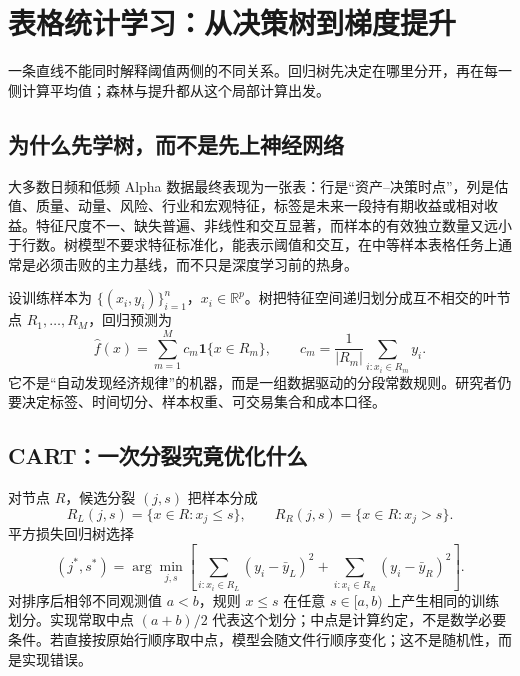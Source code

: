 \chapter{表格统计学习：从决策树到梯度提升}
\label{ch:lower-ml-model}

\begin{itemize}
  
\end{itemize}

一条直线不能同时解释阈值两侧的不同关系。回归树先决定在哪里分开，再在每一侧计算平均值；森林与提升都从这个局部计算出发。


\section{为什么先学树，而不是先上神经网络}

大多数日频和低频 Alpha 数据最终表现为一张表：行是“资产--决策时点”，列是估值、质量、动量、风险、行业和宏观特征，标签是未来一段持有期收益或相对收益。特征尺度不一、缺失普遍、非线性和交互显著，而样本的有效独立数量又远小于行数。树模型不要求特征标准化，能表示阈值和交互，在中等样本表格任务上通常是必须击败的主力基线，而不只是深度学习前的热身\cite{gu2020mlassetpricing}。

设训练样本为 $\{(x_i,y_i)\}_{i=1}^n$，$x_i\in\mathbb R^p$。树把特征空间递归划分成互不相交的叶节点 $R_1,\ldots,R_M$，回归预测为
\[
\hat f(x)=\sum_{m=1}^M c_m\mathbf 1\{x\in R_m\},
\qquad
c_m=\frac{1}{|R_m|}\sum_{i:x_i\in R_m}y_i.
\]
它不是“自动发现经济规律”的机器，而是一组数据驱动的分段常数规则。研究者仍要决定标签、时间切分、样本权重、可交易集合和成本口径。

\section{CART：一次分裂究竟优化什么}

对节点 $R$，候选分裂 $(j,s)$ 把样本分成
\[
R_L(j,s)=\{x\in R:x_j\le s\},\qquad
R_R(j,s)=\{x\in R:x_j>s\}.
\]
平方损失回归树选择
\[
(j^*,s^*)=\arg\min_{j,s}
\left[
\sum_{i:x_i\in R_L}(y_i-\bar y_L)^2+
\sum_{i:x_i\in R_R}(y_i-\bar y_R)^2
\right].
\]
对排序后相邻不同观测值 $a<b$，规则 $x\le s$ 在任意 $s\in[a,b)$ 上产生相同的训练划分。实现常取中点 $(a+b)/2$ 代表这个划分；中点是计算约定，不是数学必要条件。若直接按原始行顺序取中点，模型会随文件行顺序变化；这不是随机性，而是实现错误。




